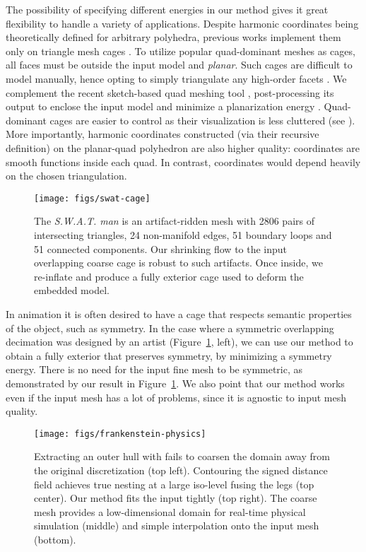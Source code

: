 The possibility of specifying different energies in our method
gives it great flexibility to handle a variety of applications.
Despite harmonic coordinates being theoretically defined for arbitrary
polyhedra, previous works implement them only on triangle mesh cages
\cite{HarmonicCoodinates07}.
%
To utilize popular quad-dominant meshes as cages, all faces must be outside the
input model and \emph{planar}.
%
Such cages are difficult to model manually, hence opting to simply triangulate
any high-order facets \cite{HarmonicCoodinates07}.
%
We complement the recent sketch-based quad meshing tool \cite{Takayama:2013},
post-processing its output to enclose the input model and
minimize a planarization energy \cite{poranne2013interactive}.
%
Quad-dominant cages are easier to control as their visualization is less
cluttered (see ).
%
More importantly, harmonic coordinates constructed (via their recursive
definition) on the planar-quad polyhedron are also higher quality:
coordinates are smooth functions inside each quad.
%
In contrast, coordinates would depend heavily on the chosen triangulation.

\begin{figure}
  \texttt{[image: figs/swat-cage]}
  \caption{The \emph{S.W.A.T. man} is an artifact-ridden mesh with 2806 pairs
  of intersecting triangles, 24 non-manifold edges, 51 boundary loops and 51
  connected components. Our shrinking flow to the input overlapping coarse cage
  is robust to such artifacts. Once inside, we re-inflate and produce a fully
  exterior cage used to deform the embedded model.}
  \label{fig:swat-cage}
\end{figure}

In animation it is often desired to have a cage that respects semantic
properties of the object, such as symmetry. In the case where a symmetric overlapping
decimation was designed by an artist (Figure~\ref{fig:swat-cage}, left), we can use our method
to obtain a fully exterior that preserves symmetry, by minimizing a symmetry energy.
There is no need for the input fine mesh to be symmetric, as demonstrated
by our result in Figure~\ref{fig:swat-cage}. We also point that our method works
even if the input mesh has a lot of problems, since it is agnostic to input mesh quality.


\begin{figure}
  \texttt{[image: figs/frankenstein-physics]}
  \caption{Extracting an outer hull with \protect\cite{Jacobson:WN:2013} fails
  to coarsen the domain away from the original discretization (top left). Contouring
  the signed distance field \protect\cite{Xu:2014:SDF} achieves true nesting at
  a large iso-level fusing the legs (top center). Our method fits the input
  tightly (top right). The coarse mesh provides a low-dimensional domain for
  real-time physical simulation (middle) and simple interpolation onto the
  input mesh (bottom).}
  \label{fig:frankenstein-physics}
\end{figure}

